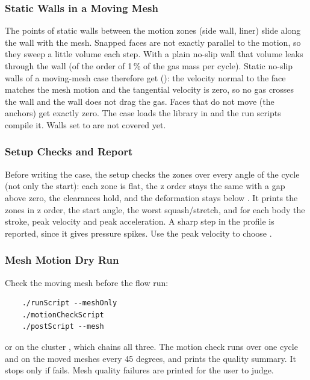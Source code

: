 \subsubsection{Static Walls in a Moving Mesh}
The points of static walls between the motion zones (side wall, liner) slide along the wall with the mesh. Snapped faces are not exactly parallel to the motion, so they sweep a little volume each step. With a plain no-slip wall that volume leaks through the wall (of the order of 1\,\% of the gas mass per cycle). Static no-slip walls of a moving-mesh case therefore get  (): the velocity normal to the face matches the mesh motion and the tangential velocity is zero, so no gas crosses the wall and the wall does not drag the gas. Faces that do not move (the anchors) get exactly zero. The case loads the library in  and the run scripts compile it. Walls set to  are not covered yet.

\subsubsection{Setup Checks and Report}
Before writing the case, the setup checks the zones over every angle of the cycle (not only the start): each zone is flat, the z order stays the same with a gap above zero, the clearances hold, and the deformation stays below . It prints the zones in z order, the start angle, the worst squash/stretch, and for each body the stroke, peak velocity and peak acceleration. A sharp step in the profile is reported, since it gives pressure spikes. Use the peak velocity to choose .

\subsubsection{Mesh Motion Dry Run}
Check the moving mesh before the flow run:
\begin{lstlisting}
    ./runScript --meshOnly
    ./motionCheckScript
    ./postScript --mesh
\end{lstlisting}
or on the cluster , which chains all three. The motion check runs  over one cycle and  on the moved meshes every 45 degrees, and prints the quality summary. It stops only if  fails. Mesh quality failures are printed for the user to judge.


